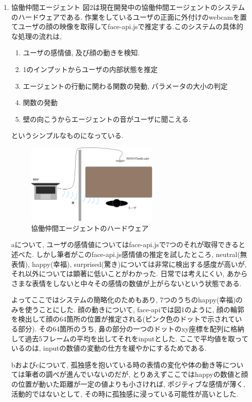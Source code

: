 \documentclass[a4paper,dvipdfmx]{hisken}
\begin{document}
\begin{enumerate}
\item 協働仲間エージェント
図2は現在開発中の協働仲間エージェントのシステムのハードウェアである. 作業をしているユーザの正面に外付けのwebcamを置てユーザの顔の映像を取得してface-api.jsで推定する.このシステムの具体的な処理の流れは, 

\begin{enumerate}
\item ユーザの感情値, 及び顔の動きを検知.
\item 1のインプットからユーザの内部状態を推定
\item エージェントの行動に関わる関数の発動, パラメータの大小の判定
\item 関数の発動
\item 壁の向こうからエージェントの音がユーザに聞こえる.
\end{enumerate}
というシンプルなものになっている. 

\begin{figure}
  \includegraphics[width=65mm]{StrangerAgent_hardware.png}
  \caption{協働仲間エージェントのハードウェア}
  \label{fig:detection}
\end{figure}

aについて, ユーザの感情値についてはface-api.jsで7つのそれが取得できると述べた. しかし筆者がこのface-api.js感情値の推定を試したところ, neutral(無表情), happy(幸福), surprised(驚き)については非常に検出する感度が高いが, それ以外については顕著に低いことがわかった. 日常では考えにくい, あからさまな表情をしないと中々その感情の数値が上がらないという状態である. 

よってここではシステムの簡略化のためもあり, 7つのうちのhappy(幸福)のみを使うことにした. 顔の動きについて, face-apiでは図1のように, 顔の輪郭を検出して顔の64箇所の位置が推定される(ピンク色のドットで示されている部分). その64箇所のうち, 鼻の部分の一つのドットのxy座標を配列に格納して過去5フレームの平均を出してそれをinputとした. ここで平均値を取っているのは, inputの数値の変動の仕方を緩やかにするためである.

bおよびcについて, 孤独感を抱いている時の表情の変化や体の動き等については筆者の調べが進んでいないのだが, とりあえずここではhappyの数値と顔の位置が動いた距離が一定の値よりも小さければ, ポジティブな感情が薄く, 活動的ではないとして, その時に孤独感に浸っている可能性が高いとした. 


\end{enumerate}
\end{document}

